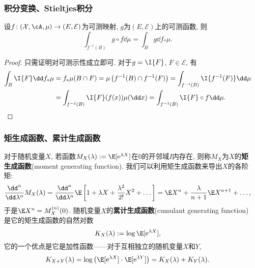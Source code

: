 \subsubsection{积分变换、Stieltjes积分}

\begin{theorem}[积分变换]\label{thm:IntegralTransform}
	设$f \colon (\mathcal{X}, \cA, \mu) \to (E, \mathcal{E})$为可测映射, $g$为$(E, \mathcal{E})$上的可测函数, 则
	\begin{equation*}
		\int_{f^{-1}(B)} g \circ f \dd \mu 
		= \int_B g \dd f_* \mu. 
	\end{equation*}
\end{theorem}
\begin{proof}
	只需证明对可测示性成立即可. 
	对于$g = \I{F}$, $F \in \mathcal{E}$, 有
	\begin{align*}
		\int_B \I{F} \dd f_* \mu
		&= f_* \mu(B \cap F)
		= \mu \left( f^{-1}(B) \cap f^{-1}(F) \right)
		= \int_{f^{-1}(B)} \I{f^{-1}(F)} \dd \mu \\
		&= \int_{f^{-1}(B)} \I{F}(f(x)) \mu(\dd x)
		=\int_{f^{-1}(B)} \I{F} \circ f \dd \mu. 
	\end{align*}
\end{proof}


\subsubsection{矩生成函数、累计生成函数}

对于随机变量$X$, 若函数$M_X(\lambda) := \E[\mathrm{e}^{\lambda X}]$在$0$的开邻域$I$内存在, 则称$M_X$为$X$的\textbf{矩生成函数}(moment generating function).
我们可以利用矩生成函数来导出$X$的各阶矩: 
\begin{equation*}
	\frac{\dd^n}{\dd \lambda^n} M_X(\lambda)
	= \frac{\dd^n}{\dd \lambda^n} \E \left[ 1 + \lambda X + \frac{\lambda^2}{2!} X^2 + \dots \right]
	= \E X^n + \frac{\lambda}{n + 1} \E X^{n+1} + \dots, 
\end{equation*}
于是$\E X^n = M_X^{(n)}(0)$. 
随机变量$X$的\textbf{累计生成函数}(cumulant generating function)是它的矩生成函数的自然对数 
\begin{equation*}
	K_X(\lambda) := \log \E[\mathrm{e}^{\lambda X}], 
\end{equation*}
它的一个优点是它是加性函数——对于互相独立的随机变量$X$和$Y$, 
\begin{equation*}
	K_{X+Y}(\lambda) 
	= \log \left(\E[\mathrm{e}^{\lambda X}] \cdot \E[\mathrm{e}^{\lambda Y}]\right)
	= K_X(\lambda) + K_Y(\lambda). 
\end{equation*}
 


